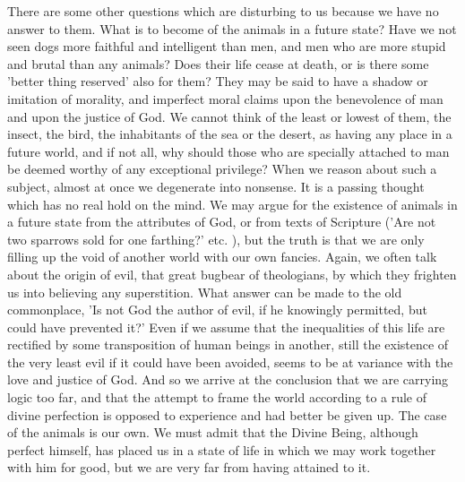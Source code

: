 \documentclass[11pt,letter]{article}
\begin{document}
\par  There are some other questions which are disturbing to us because we have no answer to them. What is to become of the animals in a future state? Have we not seen dogs more faithful and intelligent than men, and men who are more stupid and brutal than any animals? Does their life cease at death, or is there some 'better thing reserved' also for them? They may be said to have a shadow or imitation of morality, and imperfect moral claims upon the benevolence of man and upon the justice of God. We cannot think of the least or lowest of them, the insect, the bird, the inhabitants of the sea or the desert, as having any place in a future world, and if not all, why should those who are specially attached to man be deemed worthy of any exceptional privilege? When we reason about such a subject, almost at once we degenerate into nonsense. It is a passing thought which has no real hold on the mind. We may argue for the existence of animals in a future state from the attributes of God, or from texts of Scripture ('Are not two sparrows sold for one farthing?' etc. ), but the truth is that we are only filling up the void of another world with our own fancies. Again, we often talk about the origin of evil, that great bugbear of theologians, by which they frighten us into believing any superstition. What answer can be made to the old commonplace, 'Is not God the author of evil, if he knowingly permitted, but could have prevented it?' Even if we assume that the inequalities of this life are rectified by some transposition of human beings in another, still the existence of the very least evil if it could have been avoided, seems to be at variance with the love and justice of God. And so we arrive at the conclusion that we are carrying logic too far, and that the attempt to frame the world according to a rule of divine perfection is opposed to experience and had better be given up. The case of the animals is our own. We must admit that the Divine Being, although perfect himself, has placed us in a state of life in which we may work together with him for good, but we are very far from having attained to it.
\end{document}
